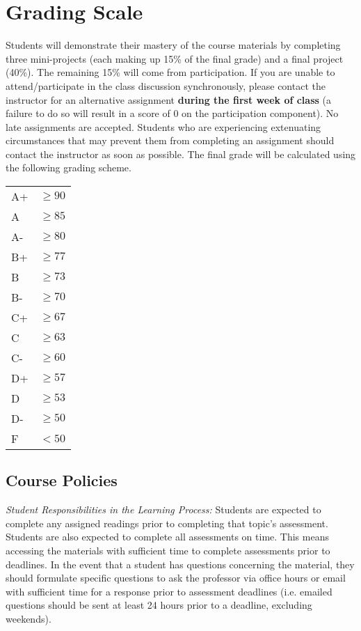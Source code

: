 \documentclass[12pt]{article}
\begin{document}
\section*{Grading Scale}
Students will demonstrate their mastery of the course materials by completing three mini-projects (each making up 15\% of the final grade) and a final project (40\%). The remaining 15\% will come from participation. If you are unable to attend/participate in the class discussion synchronously, please contact the instructor for an alternative assignment \textbf{during the first week of class} (a failure to do so will result in a score of 0 on the participation component). No late assignments are accepted. Students who are experiencing extenuating circumstances that may prevent them from completing an assignment should contact the instructor as soon as possible.  The final grade will be calculated using the following grading scheme.\\

\begin{tabular}{ll}
A+ & $\geq 90$   \\
A & $\geq 85$  \\
A- & $\geq 80$  \\
B+ & $\geq 77$   \\
B & $\geq 73$   \\
B- & $\geq 70$   \\
C+ & $\geq 67$   \\
C & $\geq 63$   \\
C- & $\geq 60$   \\
D+ & $\geq 57$   \\
D & $\geq 53$   \\
D- & $\geq 50$   \\
F & $< 50$ \\
\end{tabular}

\subsection*{Course Policies}
\textit{Student Responsibilities in the Learning Process:} Students are expected to complete any assigned readings prior to completing that topic's assessment. Students are also expected to complete all assessments on time. This means accessing the materials with sufficient time to complete assessments prior to deadlines. In the event that a student has questions concerning the material, they should formulate specific questions to ask the professor via office hours or email with sufficient time for a response prior to assessment deadlines (i.e. emailed questions should be sent at least 24 hours prior to a deadline, excluding weekends).\\
\end{document}
